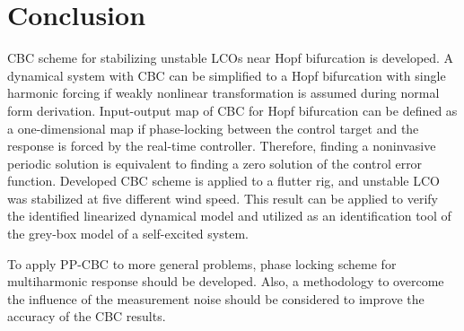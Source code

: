 \documentclass[openacc]{rsproca_new}%
\begin{document}
\section{Conclusion}
CBC scheme for stabilizing unstable LCOs near Hopf bifurcation is developed. A dynamical system with CBC can be simplified to a Hopf bifurcation with single harmonic forcing if weakly nonlinear transformation is assumed during normal form derivation. Input-output map of CBC for Hopf bifurcation can be defined as a one-dimensional map if phase-locking between the control target and the response is forced by the real-time controller. Therefore, finding a noninvasive periodic solution is equivalent to finding a zero solution of the control error function. Developed CBC scheme is applied to a flutter rig, and unstable LCO was stabilized at five different wind speed. This result can be applied to verify the identified linearized dynamical model and utilized as an identification tool of the grey-box model of a self-excited system.

To apply PP-CBC to more general problems, phase locking scheme for multiharmonic response should be developed. Also, a methodology to overcome the influence of the measurement noise should be considered to improve the accuracy of the CBC results. \vskip6pt


\enlargethispage{20pt}





\end{document}
